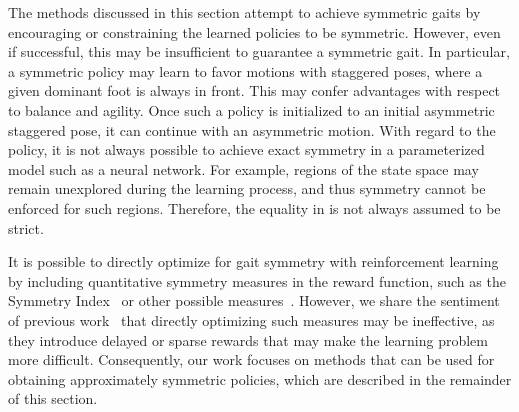 The methods discussed in this section attempt to achieve symmetric gaits by encouraging or constraining 
the learned policies to be symmetric. However, even if successful, this may be insufficient to guarantee a symmetric gait.  
In particular, a symmetric policy may learn to favor motions with staggered poses, where a given dominant foot is always in front.
This may confer advantages with respect to balance and agility.  
Once  such a policy is initialized to an initial asymmetric staggered pose, it can continue
with an asymmetric motion.
With regard to the policy, it is not always possible to achieve exact symmetry in a parameterized model 
such as a neural network.  For example, regions of the state space may remain unexplored 
during the learning process, and thus symmetry cannot be enforced for such regions.  
Therefore, the equality in  is not always assumed to be strict.

It is possible to directly optimize for gait symmetry with reinforcement learning by 
including quantitative symmetry measures in the reward function, such as the Symmetry Index~\citep{robinson1987use} 
or other possible measures~\citep{symmetry_measures}. However, we share the sentiment 
of previous work~\citep{Yu-SIGGRAPH-2018} that directly optimizing such measures 
may be ineffective, as they introduce delayed or sparse rewards that may make the learning problem more difficult.  
Consequently, our work focuses on methods that can be used for obtaining approximately 
symmetric policies, which are described in the remainder of this section.





